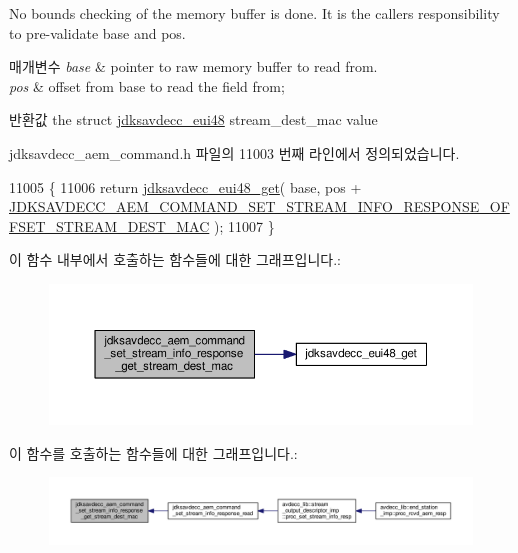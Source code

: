 No bounds checking of the memory buffer is done. It is the caller\textquotesingle{}s responsibility to pre-\/validate base and pos.


\begin{DoxyParams}{매개변수}
{\em base} & pointer to raw memory buffer to read from. \\
\hline
{\em pos} & offset from base to read the field from; \\
\hline
\end{DoxyParams}
\begin{DoxyReturn}{반환값}
the struct \hyperlink{structjdksavdecc__eui48}{jdksavdecc\+\_\+eui48} stream\+\_\+dest\+\_\+mac value 
\end{DoxyReturn}


jdksavdecc\+\_\+aem\+\_\+command.\+h 파일의 11003 번째 라인에서 정의되었습니다.


\begin{DoxyCode}
11005 \{
11006     \textcolor{keywordflow}{return} \hyperlink{group__eui48_ga7b4c95f03a90bdf416e9d0833ac08a86}{jdksavdecc\_eui48\_get}( base, pos + 
      \hyperlink{group__command__set__stream__info__response_gae3c3cca41b4c6656ececc8a1b9f7d07f}{JDKSAVDECC\_AEM\_COMMAND\_SET\_STREAM\_INFO\_RESPONSE\_OFFSET\_STREAM\_DEST\_MAC}
       );
11007 \}
\end{DoxyCode}


이 함수 내부에서 호출하는 함수들에 대한 그래프입니다.\+:
\nopagebreak
\begin{figure}[H]
\begin{center}
\leavevmode
\includegraphics[width=350pt]{group__command__set__stream__info__response_ga2261c2315e02e415e0b56e8161e15aee_cgraph}
\end{center}
\end{figure}




이 함수를 호출하는 함수들에 대한 그래프입니다.\+:
\nopagebreak
\begin{figure}[H]
\begin{center}
\leavevmode
\includegraphics[width=350pt]{group__command__set__stream__info__response_ga2261c2315e02e415e0b56e8161e15aee_icgraph}
\end{center}
\end{figure}


